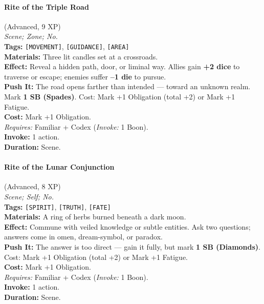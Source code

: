 \paragraph{Rite of the Triple Road} (Advanced, 9 XP) \hfill \\
\emph{Scene; Zone; No.} \\
\textbf{Tags:} \texttt{[MOVEMENT]}, \texttt{[GUIDANCE]}, \texttt{[AREA]} \\
\textbf{Materials:} Three lit candles set at a crossroads. \\
\textbf{Effect:} Reveal a hidden path, door, or liminal way. Allies gain \textbf{+2 dice} to traverse or escape; enemies suffer \textbf{--1 die} to pursue. \\
\textbf{Push It:} The road opens farther than intended --- toward an unknown realm. Mark \textbf{1 SB (Spades)}. Cost: Mark +1 Obligation (total +2) or Mark +1 Fatigue. \\
\textbf{Cost:} Mark +1 Obligation. \\
\textit{Requires:} Familiar + Codex (\textit{Invoke:} 1 Boon). \\
\textbf{Invoke:} 1 action. \\
\textbf{Duration:} Scene.

\paragraph{Rite of the Lunar Conjunction} (Advanced, 8 XP) \hfill \\
\emph{Scene; Self; No.} \\
\textbf{Tags:} \texttt{[SPIRIT]}, \texttt{[TRUTH]}, \texttt{[FATE]} \\
\textbf{Materials:} A ring of herbs burned beneath a dark moon. \\
\textbf{Effect:} Commune with veiled knowledge or subtle entities. Ask two questions; answers come in omen, dream-symbol, or paradox. \\
\textbf{Push It:} The answer is too direct --- gain it fully, but mark \textbf{1 SB (Diamonds)}. Cost: Mark +1 Obligation (total +2) or Mark +1 Fatigue. \\
\textbf{Cost:} Mark +1 Obligation. \\
\textit{Requires:} Familiar + Codex (\textit{Invoke:} 1 Boon). \\
\textbf{Invoke:} 1 action. \\
\textbf{Duration:} Scene.

